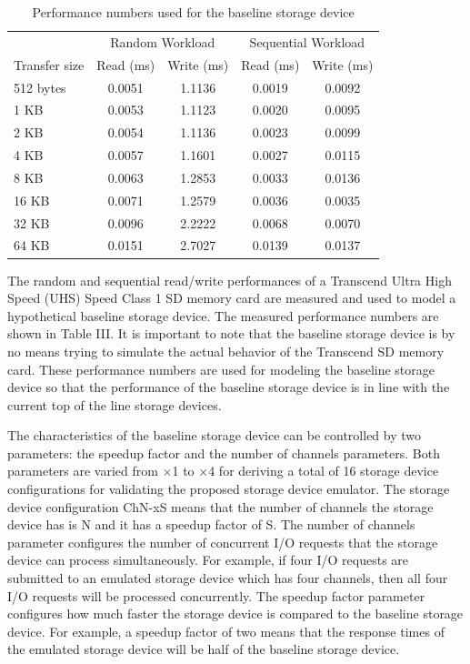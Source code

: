 \begin{table}[htbp]%
	\centering
	\caption{Performance numbers used for the baseline storage device}\label{tab:ch6-3}
	\noindent\begin{tabular}{lcccc}
		\toprule
		& \multicolumn{2}{c}{Random Workload} & \multicolumn{2}{c}{Sequential Workload} \\
		\cmidrule(lr){2-3}
		\cmidrule(lr){4-5}
		\parbox{3cm}{\centering Transfer size} & \parbox{2cm}{\centering Read (\si{\milli\second}) } & \parbox{2cm}{\centering Write (\si{\milli\second}) } & \parbox{2cm}{\centering Read (\si{\milli\second}) } & \parbox{3cm}{\centering Write (\si{\milli\second})} \\
		
		\midrule
		
		512 bytes & 0.0051 & 1.1136 & 0.0019 & 0.0092 \\
		1 KB & 0.0053 & 1.1123 & 0.0020 & 0.0095 \\
		2 KB & 0.0054 & 1.1136 & 0.0023 & 0.0099 \\
		4 KB & 0.0057 & 1.1601 & 0.0027 & 0.0115 \\
		8 KB & 0.0063 & 1.2853 & 0.0033 & 0.0136 \\
		16 KB & 0.0071 & 1.2579 & 0.0036 & 0.0035 \\
		32 KB & 0.0096 & 2.2222 & 0.0068 & 0.0070 \\
		64 KB & 0.0151 & 2.7027 & 0.0139 & 0.0137 \\
		
		\bottomrule
	\end{tabular}
\end{table}%

The random and sequential read/write performances of a Transcend Ultra High Speed (UHS) Speed Class 1 SD memory card are measured and used to model a hypothetical baseline storage device. The measured performance numbers are shown in Table III. It is important to note that the baseline storage device is by no means trying to simulate the actual behavior of the Transcend SD memory card. These performance numbers are used for modeling the baseline storage device so that the performance of the baseline storage device is in line with the current top of the line storage devices.

The characteristics of the baseline storage device can be controlled by two parameters: the speedup factor and the number of channels parameters. Both parameters are varied from $\times$1 to $\times$4 for deriving a total of 16 storage device configurations for validating the proposed storage device emulator. The storage device configuration ChN-xS means that the number of channels the storage device has is N and it has a speedup factor of S. The number of channels parameter configures the number of concurrent I/O requests that the storage device can process simultaneously. For example, if four I/O requests are submitted to an emulated storage device which has four channels, then all four I/O requests will be processed concurrently. The speedup factor parameter configures how much faster the storage device is compared to the baseline storage device. For example, a speedup factor of two means that the response times of the emulated storage device will be half of the baseline storage device.

